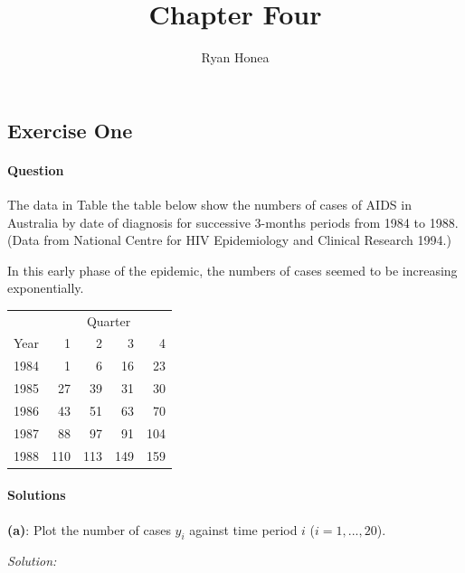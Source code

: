 \documentclass[]{article}
\title{Chapter Four}
\author{Ryan Honea}
\date{}
\let\oldparagraph\paragraph
\renewcommand{\paragraph}[1]{\oldparagraph{#1}\mbox{}}
\begin{document}
\maketitle

\subsection{Exercise One}\label{exercise-one}

\paragraph{Question}\label{question}

The data in Table the table below show the numbers of cases of AIDS in
Australia by date of diagnosis for successive 3-months periods from 1984
to 1988. (Data from National Centre for HIV Epidemiology and Clinical
Research 1994.)

In this early phase of the epidemic, the numbers of cases seemed to be
increasing exponentially.

\begin{center}
\begin{tabular}{@{}crrrr@{}}
\toprule
     & \multicolumn{4}{c}{Quarter} \\
Year & 1     & 2     & 3    & 4    \\ \midrule
1984 & 1     & 6     & 16   & 23   \\
1985 & 27    & 39    & 31   & 30   \\
1986 & 43    & 51    & 63   & 70   \\
1987 & 88    & 97    & 91   & 104  \\
1988 & 110   & 113   & 149  & 159  \\ \bottomrule
\end{tabular}
\end{center}

\paragraph{Solutions}\label{solutions}

\textbf{(a)}: Plot the number of cases \(y_i\) against time period \(i\)
(\(i = 1,...,20\)).

\emph{Solution: }
\end{document}
